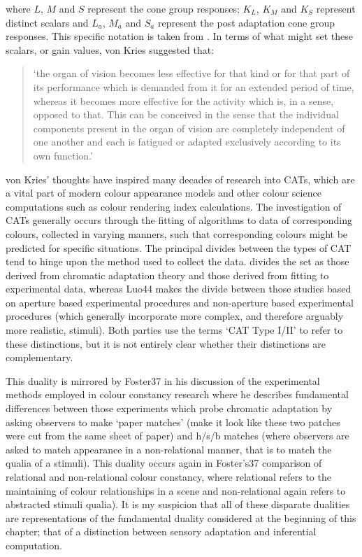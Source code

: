 where $L$, $M$ and $S$ represent the cone group responses; $K_{L}$, $K_{M}$ and $K_{S}$ represent distinct scalars and $L_{a}$, $M_{a}$ and $S_{a}$ represent the post adaptation cone group responses. This specific notation is taken from \citet[p. 183]{fairchild_color_2013}. In terms of what might set these scalars, or gain values, von Kries suggested that: 

\begin{quote}
`the organ of vision becomes less effective for that kind or for that part of its performance which is demanded from it for an extended period of time, whereas it becomes more effective for the activity which is, in a sense, opposed to that. This can be conceived in the sense that the individual components present in the organ of vision are completely independent of one another and each is fatigued or adapted exclusively according to its own function.'\citep{von_kries_beitrag_1970}
\end{quote}

von Kries' thoughts have inspired many decades of research into \glspl{CAT}, which are a vital part of modern colour appearance models and other colour science computations such as colour rendering index calculations. The investigation of \glspl{CAT} generally occurs through the fitting of algorithms to data of corresponding colours, collected in varying manners, such that corresponding colours might be predicted for specific situations. The principal divides between the types of \gls{CAT} tend to hinge upon the method used to collect the data. \citet{nayatani_development_2006} divides the set as those derived from chromatic adaptation theory and those derived from fitting to experimental data, whereas Luo44 makes the divide between those studies based on aperture based experimental procedures and non-aperture based experimental procedures (which generally incorporate more complex, and therefore arguably more realistic, stimuli). Both parties use the terms `CAT Type I/II' to refer to these distinctions, but it is not entirely clear whether their distinctions are complementary. 

This duality %
is mirrored by Foster37 in his discussion of the experimental methods employed in colour constancy research where he describes fundamental differences between those experiments which probe chromatic adaptation by asking observers to make `paper matches' (make it look like these two patches were cut from the same sheet of paper) and h/s/b matches (where observers are asked to match appearance in a non-relational manner, that is to match the qualia of a stimuli). This duality occurs again in Foster's37 comparison of relational and non-relational colour constancy, where relational refers to the maintaining of colour relationships in a scene and non-relational again refers to abstracted stimuli qualia). It is my suspicion that all of these disparate dualities are representations of the fundamental duality considered at the beginning of this chapter; that of a distinction between sensory adaptation and inferential computation.

